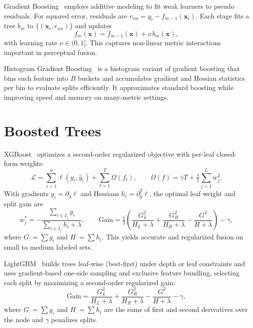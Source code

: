 Gradient Boosting~\cite{gradboost} employs additive modeling to fit weak learners to pseudo residuals. For squared error, residuals are \(r_{im}=y_i-f_{m-1}(\mathbf{x}_i)\). Each stage fits a tree \(b_m\) to \(\{(\mathbf{x}_i,r_{im})\}\) and updates
\begin{equation}
f_m(\mathbf{x})=f_{m-1}(\mathbf{x})+\nu\,b_m(\mathbf{x}),
\end{equation}
with learning rate \(\nu\in(0,1]\). This captures non-linear metric interactions important in perceptual fusion.

Histogram Gradient Boosting~\cite{histogram} is a histogram variant of gradient boosting that bins each feature into \(B\) buckets and accumulates gradient and Hessian statistics per bin to evaluate splits efficiently. It approximates standard boosting while improving speed and memory on many-metric settings.

\section{Boosted Trees}\label{sec:modern}

\acf{XGBoost}~\cite{xgboost} optimizes a second-order regularized objective with per-leaf closed-form weights:
\begin{equation}
\mathcal{L}=\sum_{i=1}^{n}\ell(y_i,\hat{y}_i)+\sum_{t=1}^{T}\Omega(f_t),\qquad
\Omega(f)=\gamma T+\tfrac{\lambda}{2}\sum_{j=1}^{L}w_j^2.
\end{equation}
With gradients \(g_i=\partial_{\hat{y}}\ell\) and Hessians \(h_i=\partial_{\hat{y}}^2\ell\), the optimal leaf weight and split gain are
\begin{equation}
w_j^{*}=-\frac{\sum_{i\in I_j} g_i}{\sum_{i\in I_j} h_i+\lambda},\qquad
\mathrm{Gain}=\tfrac{1}{2}\left(\frac{G_L^2}{H_L+\lambda}+\frac{G_R^2}{H_R+\lambda}-\frac{G^2}{H+\lambda}\right)-\gamma,
\end{equation}
where \(G_{\cdot}=\sum g_i\) and \(H_{\cdot}=\sum h_i\). This yields accurate and regularized fusion on small to medium labeled sets.

\acf{LightGBM}~\cite{lightgbm} builds trees leaf-wise (best-first) under depth or leaf constraints and uses gradient-based one-side sampling and exclusive feature bundling, selecting each split by maximizing a second-order regularized gain:
\begin{equation}
\mathrm{Gain}=\frac{G_L^2}{H_L+\lambda}+\frac{G_R^2}{H_R+\lambda}-\frac{G^2}{H+\lambda}-\gamma,
\end{equation}
where $G_\cdot=\sum g_i$ and $H_\cdot=\sum h_i$ are the sums of first and second derivatives over the node and $\gamma$ penalizes splits.

